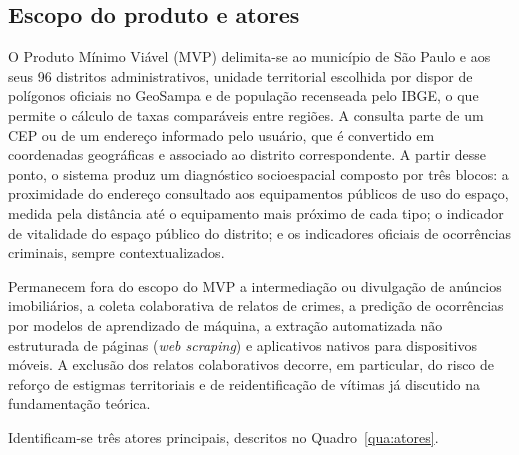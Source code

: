 \subsection{Escopo do produto e atores}

O Produto Mínimo Viável (MVP) delimita-se ao município de São Paulo e aos seus 96 distritos administrativos, unidade territorial escolhida por dispor de polígonos oficiais no GeoSampa e de população recenseada pelo IBGE, o que permite o cálculo de taxas comparáveis entre regiões. A consulta parte de um CEP ou de um endereço informado pelo usuário, que é convertido em coordenadas geográficas e associado ao distrito correspondente. A partir desse ponto, o sistema produz um diagnóstico socioespacial composto por três blocos: a proximidade do endereço consultado aos equipamentos públicos de uso do espaço, medida pela distância até o equipamento mais próximo de cada tipo; o indicador de vitalidade do espaço público do distrito; e os indicadores oficiais de ocorrências criminais, sempre contextualizados.

Permanecem fora do escopo do MVP a intermediação ou divulgação de anúncios imobiliários, a coleta colaborativa de relatos de crimes, a predição de ocorrências por modelos de aprendizado de máquina, a extração automatizada não estruturada de páginas (\emph{web scraping}) e aplicativos nativos para dispositivos móveis. A exclusão dos relatos colaborativos decorre, em particular, do risco de reforço de estigmas territoriais e de reidentificação de vítimas já discutido na fundamentação teórica.

Identificam-se três atores principais, descritos no Quadro~\ref{qua:atores}.


